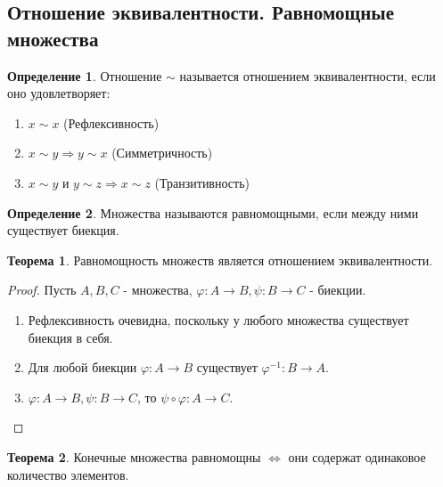\documentclass[a4paper, 12pt]{article}
\renewcommand{\phi}{\varphi}
\newcommand{\lra}{\Leftrightarrow}
\theoremstyle{definition}
\newtheorem*{definition}{Определение}
\newtheorem*{theorem}{Теорема}
\begin{document}
        \subsection{Отношение эквивалентности. Равномощные множества}
        \begin{definition}
            Отношение $\sim$ называется отношением эквивалентности, если оно удовлетворяет:
            \begin{enumerate}
                \item $x\sim x$ (Рефлексивность)
                \item $x\sim y \Rightarrow y\sim x$ (Симметричность)
                \item $x\sim y$ и $y\sim z\Rightarrow x\sim z$ (Транзитивность)
            \end{enumerate}
        \end{definition} 
        \begin{definition}
            Множества называются равномощными, если между ними существует биекция.
        \end{definition}
        \begin{theorem}
            Равномощность множеств является отношением эквивалентности.
        \end{theorem}
        \begin{proof} Пусть $A,B,C$ - множества, $\phi:A\to B, \psi:B\to C$ - биекции.
            \begin{enumerate}
                \item Рефлексивность очевидна, поскольку у любого множества существует биекция в себя.
                \item Для любой биекции $\phi:A\to B$ существует $\phi^{-1}:B\to A$.
                \item $\phi:A\to B, \psi:B\to C$, то $\psi \circ \phi: A\to C$.
            \end{enumerate}
        \end{proof} 
        \begin{theorem}
            Конечные множества равномощны $\lra$ они содержат одинаковое количество элементов.
        \end{theorem}
\end{document}
